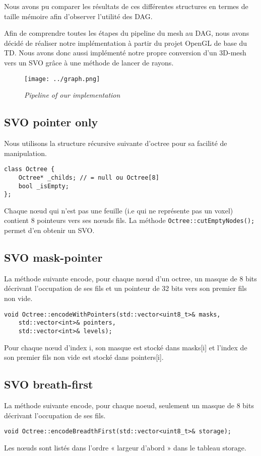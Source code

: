 \documentclass[a4paper]{article}
\begin{document}
Nous avons pu comparer les résultats de ces différentes structures en termes de taille mémoire afin d'observer l'utilité des DAG.


Afin de comprendre toutes les étapes du pipeline du mesh au DAG, nous avons décidé de réaliser notre implémentation à partir du projet OpenGL de base du TD. Nous avons donc aussi implémenté notre propre conversion d’un 3D-mesh vers un SVO grâce à une méthode de lancer de rayons.

\begin{figure}
\centering
\texttt{[image: ../graph.png]}
\caption{\label{fig:triceratops}\textit{Pipeline of our implementation}}
\end{figure}

\subsection{SVO pointer only}

Nous utilisons la structure récursive suivante d’octree pour sa facilité de manipulation.

\begin{lstlisting}
class Octree {
	Octree* _childs; // = null ou Octree[8]
	bool _isEmpty;
};
\end{lstlisting}

Chaque nœud qui n’est pas une feuille (i.e qui ne représente pas un voxel) contient 8 pointeurs vers ses nœuds fils. La méthode \texttt{Octree::cutEmptyNodes();} permet d’en obtenir un SVO. 

\subsection{SVO mask-pointer}

La méthode suivante encode, pour chaque nœud d'un octree, un masque de 8 bits décrivant l’occupation de ses fils et un pointeur de 32 bits vers son premier fils non vide. 

\begin{lstlisting}
void Octree::encodeWithPointers(std::vector<uint8_t>& masks, 
	std::vector<int>& pointers, 
	std::vector<int>& levels);
\end{lstlisting}

Pour chaque nœud d'index i, son masque est stocké dans masks[i] et l’index de son premier fils non vide est stocké dans pointers[i].

\subsection{SVO breath-first}

La méthode suivante encode, pour chaque noeud, seulement un masque de 8 bits décrivant l’occupation de ses fils.

\begin{lstlisting}
void Octree::encodeBreadthFirst(std::vector<uint8_t>& storage);
\end{lstlisting}
 
Les nœuds sont listés dans l’ordre « largeur d’abord » dans le tableau storage.
\end{document}
